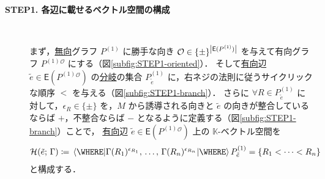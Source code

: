 \documentclass[TQFT_main]{subfiles}
\begin{document}
\begin{description}
    \item[\textbf{STEP1. 各辺に載せるベクトル空間の構成}]　
    \label{TV:STEP1}
    
    まず，\underline{無向}グラフ $P^{(1)}$ に勝手な向き $\mathcal{O} \in \{\pm\}^{\abs{\mathsf{E}(P^{(1)})}}$ を与えて有向グラフ $P^{(1)}{}^{\mathcal{O}}$ にする（図\ref{subfig:STEP1-oriented}）．
    そして\underline{有向}辺 $\tilde{e} \in \mathsf{E}(P^{(1)}{}^{\mathcal{O}})$ の\hyperref[def:polyhedron]{分岐}の集合 $P^{(1)}_{\tilde{e}}$ に，右ネジの法則に従うサイクリックな順序 $<$ を与える（図\ref{subfig:STEP1-branch}）．
    さらに $\forall R \in P_{\tilde{e}}^{(1)}$ に対して，$\epsilon_R \in \{\pm\}$ を，$M$ から誘導される向きと $\tilde{e}$ の向きが整合しているならば $+$，不整合ならば $-$ となるように定義する（図\ref{subfig:STEP1-branch}）ことで，
    \underline{有向}辺 $\tilde{e} \in \mathsf{E}(P^{(1)}{}^{\mathcal{O}})$ 上の $\mathbb{K}$-ベクトル空間を
    \begin{align}
        \mathcal{H}(\tilde{e};\, \Gamma) \coloneqq \expval{\Gamma(R_1)^{\epsilon_{R_1}},\, \dots,\, \Gamma(R_n)^{\epsilon_{R_n}}} \WHERE P_{\tilde{e}}^{(1)} = \{R_1 < \cdots < R_n\}
    \end{align}
    と構成する．

    \begin{figure}[H]
        \centering
        \begin{subfigure}{0.4\columnwidth}
            \centering
\end{subfigure}
\end{figure}
\end{description}
\end{document}
